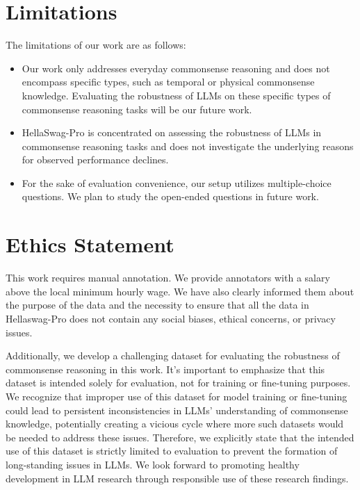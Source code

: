 \section*{Limitations}

The limitations of our work are as follows:

\begin{itemize}[leftmargin=*]
    \setlength{\itemsep}{0pt}
    \item Our work only addresses everyday commonsense reasoning and does not encompass specific types, such as temporal or physical commonsense knowledge. Evaluating the robustness of LLMs on these specific types of commonsense reasoning tasks will be our future work.

    \item HellaSwag-Pro is concentrated on assessing the robustness of LLMs in commonsense reasoning tasks and does not investigate the underlying reasons for observed performance declines.

    \item For the sake of evaluation convenience, our setup utilizes multiple-choice questions. We plan to study the open-ended questions in future work.
\end{itemize}

\section*{Ethics Statement}
This work requires manual annotation. We provide annotators with a salary above the local minimum hourly wage. We have also clearly informed them about the purpose of the data and the necessity to ensure that all the data in Hellaswag-Pro does not contain any social biases, ethical concerns, or privacy issues.

Additionally, we develop a challenging dataset for evaluating the robustness of commonsense reasoning in this work. It's important to emphasize that this dataset is intended solely for evaluation, not for training or fine-tuning purposes. We recognize that improper use of this dataset for model training or fine-tuning could lead to persistent inconsistencies in LLMs' understanding of commonsense knowledge, potentially creating a vicious cycle where more such datasets would be needed to address these issues. Therefore, we explicitly state that the intended use of this dataset is strictly limited to evaluation to prevent the formation of long-standing issues in LLMs. We look forward to promoting healthy development in LLM research through responsible use of these research findings. 
